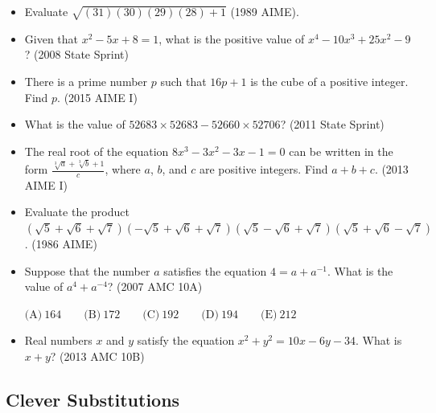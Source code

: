 \documentclass{article}
\begin{document}
\begin{itemize}
\item Evaluate $\sqrt{(31)(30)(29)(28)+1}$ (1989 AIME).

\item Given that $x^2-5x+8=1$, what is the positive value of $x^4-10x^3+25x^2-9$? (2008 State Sprint)

\item There is a prime number $p$ such that $16p+1$ is the cube of a positive integer. Find $p$. (2015 AIME I)

\item What is the value of $52683\times 52683-52660\times 52706$? (2011 State Sprint)

\item The real root of the equation $8x^3-3x^2-3x-1=0$ can be written in the form $\frac{\sqrt[3]{a}+\sqrt[3]{b}+1}{c}$, where $a$, $b$, and $c$ are positive integers. Find $a+b+c$. (2013 AIME I)

\item Evaluate the product $(\sqrt{5}+\sqrt{6}+\sqrt{7})(-\sqrt{5}+\sqrt{6}+\sqrt{7})(\sqrt{5}-\sqrt{6}+\sqrt{7})(\sqrt{5}+\sqrt{6}-\sqrt{7})$. (1986 AIME)

\item Suppose that the number $a$ satisfies the equation $4 = a + a^{ - 1}$. What is the value of $a^{4} + a^{ - 4}$? (2007 AMC 10A)

$\text{(A)}\ 164 \qquad \text{(B)}\ 172 \qquad \text{(C)}\ 192 \qquad \text{(D)}\ 194 \qquad \text{(E)}\ 212$


\item Real numbers $x$ and $y$ satisfy the equation $x^2 + y^2 = 10x - 6y - 34$. What is $x + y$? (2013 AMC 10B)

\end{itemize}





\subsection{Clever Substitutions}
\end{document}
